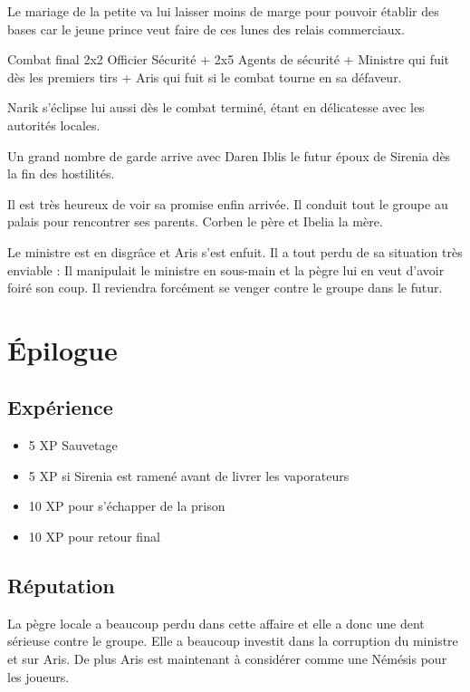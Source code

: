 \documentclass[a4paper,10pt,twoside,twocolumn,openany]{book}
\begin{document}
Le mariage de la petite va lui laisser moins de marge pour pouvoir établir des bases car le jeune
prince veut faire de ces lunes des relais commerciaux.

\begin{commentbox}{Combat final}
2x2 Officier Sécurité + 2x5 Agents de sécurité + Ministre qui fuit dès les
premiers tirs + Aris qui fuit si le combat tourne en sa défaveur.

Narik s’éclipse lui aussi dès le combat terminé, étant en délicatesse avec les autorités locales.

Un grand nombre de garde arrive avec Daren Iblis le futur époux de Sirenia dès la fin des
hostilités.
\end{commentbox}

Il est très heureux de voir sa promise enfin arrivée. Il conduit tout le groupe au palais pour
rencontrer ses parents. Corben le père et Ibelia la mère.

Le ministre est en disgrâce et Aris s’est enfuit. Il a tout perdu de sa situation très enviable : Il
manipulait le ministre en sous-main et la pègre lui en veut d’avoir foiré son coup. Il reviendra
forcément se venger contre le groupe dans le futur.

\section{\'Epilogue}
\subsection{Expérience}

\begin{itemize}
    \item 5 XP Sauvetage
    \item 5 XP si Sirenia est ramené avant de livrer les vaporateurs
    \item 10 XP pour s'échapper de la prison
    \item 10 XP pour retour final
\end{itemize}

\subsection{Réputation}

La pègre locale a beaucoup perdu dans cette affaire et elle a donc une dent sérieuse contre le
groupe. Elle a beaucoup investit dans la corruption du ministre et sur Aris. De plus Aris est
maintenant à considérer comme une Némésis pour les joueurs.
\end{document}

